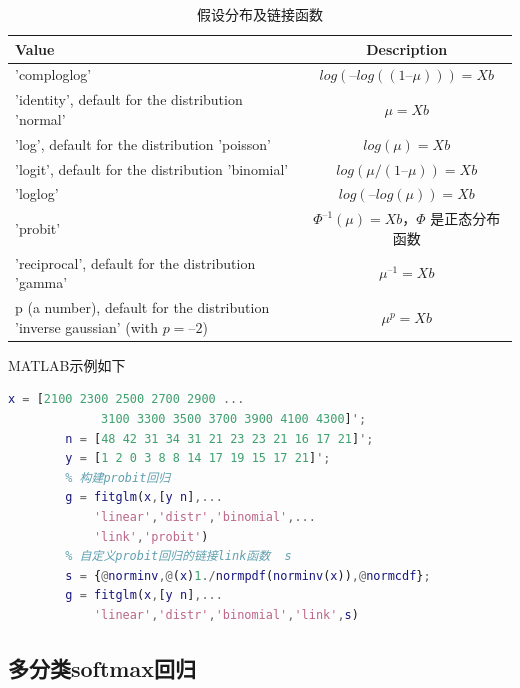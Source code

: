         \begin{table}[H]\caption{假设分布及链接函数}
        \label{tab:假设分布及链接函数}
        \centering
        \begin{tabularx}{\textwidth}{X|c}
        \toprule
        Value & Description\\
        \midrule
        'comploglog'                                  & $log(–log((1–\mu))) = Xb$\\
        'identity', default for the distribution 'normal'   & $\mu = Xb$\\
        'log', default for the distribution 'poisson'       & $log(\mu) = Xb$\\
        'logit', default for the distribution 'binomial'    & $log(\mu/(1 – \mu)) = Xb$\\
        'loglog'    & $log(–log(\mu)) = Xb$\\
        'probit'    & $\Phi^{–1}(\mu) = Xb$，$\Phi$ 是正态分布函数\\
        'reciprocal', default for the distribution 'gamma'  & $\mu^{–1} = Xb$\\
        p (a number), default for the distribution 'inverse gaussian' (with $p = –2$)&
        $\mu^p = Xb$\\
        \bottomrule
        \end{tabularx}
        \end{table}
        \par
        MATLAB示例如下
        \begin{lstlisting}[language = Matlab]
        x = [2100 2300 2500 2700 2900 ...
             3100 3300 3500 3700 3900 4100 4300]';
        n = [48 42 31 34 31 21 23 23 21 16 17 21]';
        y = [1 2 0 3 8 8 14 17 19 15 17 21]';
        % 构建probit回归
        g = fitglm(x,[y n],...
            'linear','distr','binomial',...
            'link','probit')
        % 自定义probit回归的链接link函数  s
        s = {@norminv,@(x)1./normpdf(norminv(x)),@normcdf};
        g = fitglm(x,[y n],...
            'linear','distr','binomial','link',s)
        \end{lstlisting}

    \subsection{多分类softmax回归}
